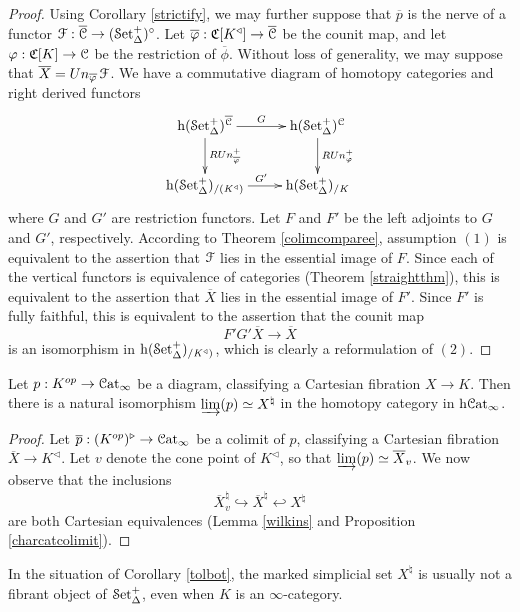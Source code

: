 \begin{proof}
Using Corollary \ref{strictify}, we may further suppose that $\overline{p}$ is the nerve
of a functor $\operatorname{\mathcal{F}}: \overline{\operatorname{\mathcal{C}}} \rightarrow (\operatorname{\mathcal{S}et_{\Delta}^{+}})^{\circ}$. Let $\overline{\varphi}: \operatorname{\mathfrak{C}}[K^{\triangleleft}] \rightarrow \overline{\operatorname{\mathcal{C}}}$ be the counit map, and let $\varphi: \operatorname{\mathfrak{C}}[K] \rightarrow \operatorname{\mathcal{C}}$ be the restriction of $\overline{\phi}$. Without loss of generality, we may suppose that $\overline{X} = Un_{\overline{\varphi}} \operatorname{\mathcal{F}}$. We have a commutative diagram of homotopy categories and right derived functors
$$ \xymatrix{ \h{(\mSet)^{\overline{\calC}}} \ar[r]^{G} \ar[d]^{R \Un^{+}_{\overline{\phi}}} &  \h{(\mSet)^{\calC}}
\ar[d]^{ R \Un^{+}_{\phi} } \\
\h{(\mSet)_{/(K^{\triangleleft})}} \ar[r]^{G'} & \h{(\mSet)_{/K}} }$$
where $G$ and $G'$ are restriction functors. Let $F$ and $F'$ be the left adjoints
to $G$ and $G'$, respectively. According to Theorem \ref{colimcomparee}, assumption $(1)$ is equivalent to the assertion that $\operatorname{\mathcal{F}}$ lies in the essential image of $F$. Since each of the vertical functors is equivalence of categories (Theorem \ref{straightthm}), this is equivalent to the assertion that $\overline{X}$ lies in the essential image of $F'$. 
Since $F'$ is fully faithful, this is equivalent to the assertion that the counit map
$$ F' G' \overline{X} \rightarrow \overline{X}$$
is an isomorphism in $\rm{h} \it{(\operatorname{\mathcal{S}et_{\Delta}^{+}})_{/K^{\triangleleft})}}$, which is clearly a reformulation of $(2)$.
\end{proof}

\begin{corollary}\label{tolbot}
Let $p: K^{op} \rightarrow \operatorname{\mathcal{C}at}_{\infty}$ be a diagram, classifying a Cartesian fibration
$X \rightarrow K$. Then there is a natural isomorphism
$\varinjlim(p) \simeq X^{\natural}$ in the homotopy category
in $\rm{h} \it{\operatorname{\mathcal{C}at}_{\infty}}$.
\end{corollary}

\begin{proof}
Let $\overline{p}: (K^{op})^{\triangleright} \rightarrow \operatorname{\mathcal{C}at}_{\infty}$ be a colimit of $p$, classifying a Cartesian fibration $\overline{X} \rightarrow K^{\triangleleft}$. Let $v$ denote the cone point of
$K^{\triangleleft}$, so that $\varinjlim(p) \simeq \overline{X}_{v}$. We now observe that the inclusions
$$\overline{X}^{\natural}_{v} \hookrightarrow \overline{X}^{\natural} \hookleftarrow X^{\natural}$$
are both Cartesian equivalences (Lemma \ref{wilkins} and Proposition \ref{charcatcolimit}). 
\end{proof}

\begin{warning}
In the situation of Corollary \ref{tolbot}, the marked simplicial set $X^{\natural}$ is usually not a fibrant object of $\operatorname{\mathcal{S}et_{\Delta}^{+}}$, even when $K$ is an $\infty$-category.
\end{warning}

